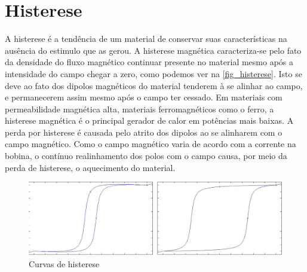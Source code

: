 \section{Histerese}
A histerese é a tendência de um material de conservar suas características na ausência do estimulo que as gerou. A histerese magnética caracteriza-se pelo fato da densidade do fluxo magnético continuar presente no material mesmo após a intensidade do campo chegar a zero, como podemos ver na \autoref{fig_histerese}. Isto se deve ao fato dos dipolos magnéticos do material tenderem à se alinhar ao campo, e permanecerem assim mesmo após o campo ter cessado.
Em materiais com permeabilidade magnética alta, materiais ferromagnéticos como o ferro, a histerese magnética é o principal gerador de calor em potências mais baixas. A perda por histerese é causada pelo atrito dos dipolos ao se alinharem com o campo magnético. Como o campo magnético varia de acordo com a corrente na bobina, o contínuo realinhamento dos polos com o campo causa, por meio da perda de histerese, o aquecimento do material.

\begin{figure}[h]
\caption{\label{fig_histerese}Curvas de histerese}
\begin{center}
\includegraphics[scale=0.5]{images/histerese.png}
\end{center}
\end{figure}